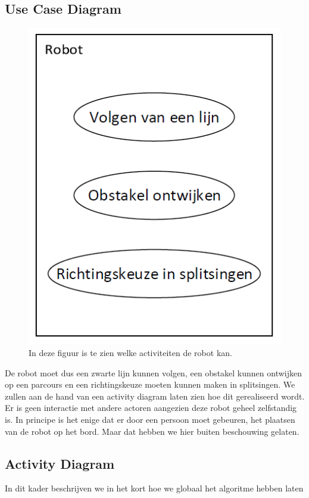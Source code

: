 \documentclass[12pt]{article}
\begin{document}
		\subsection{Use Case Diagram}
		\begin{center}
			\begin{figure}
				\includegraphics[scale=.7]{UseCase}
				\caption{In deze figuur is te zien welke activiteiten de robot kan.}
			\end{figure}
		\end{center}
		De robot moet dus een zwarte lijn kunnen volgen, een obstakel kunnen ontwijken op een parcours en een richtingskeuze moeten kunnen maken in splitsingen. We zullen aan de hand van een activity diagram laten zien hoe dit gerealiseerd wordt. \\Er is geen interactie met andere actoren aangezien deze robot geheel zelfstandig is. In principe is het enige dat er door een persoon moet gebeuren, het plaatsen van de robot op het bord. Maar dat hebben we hier buiten beschouwing gelaten.
	\subsection{Activity Diagram}
		In dit kader beschrijven we in het kort hoe we globaal het algoritme hebben laten 	
\newpage
\end{document}
